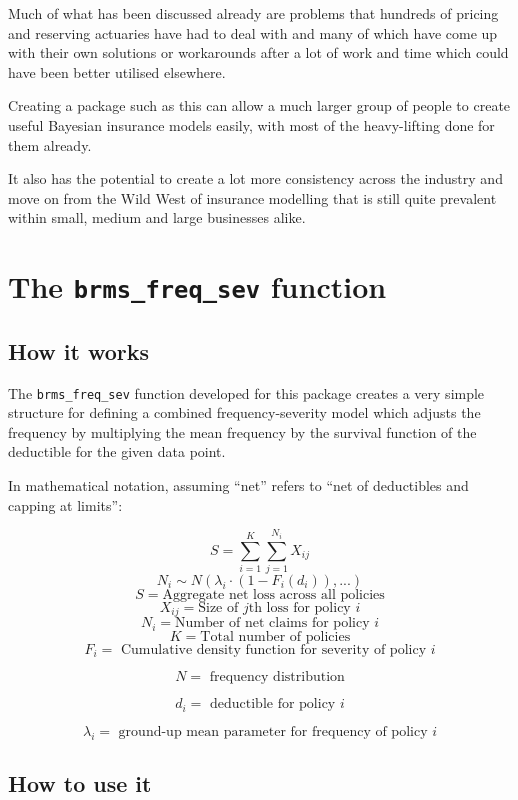 \documentclass[
]{book}
\begin{document}
Much of what has been discussed already are problems that hundreds of pricing and reserving actuaries have had to deal with and many of which have come up with their own solutions or workarounds after a lot of work and time which could have been better utilised elsewhere.

Creating a package such as this can allow a much larger group of people to create useful Bayesian insurance models easily, with most of the heavy-lifting done for them already.

It also has the potential to create a lot more consistency across the industry and move on from the Wild West of insurance modelling that is still quite prevalent within small, medium and large businesses alike.

\hypertarget{the-brms_freq_sev-function}{%
\section{\texorpdfstring{The \texttt{brms\_freq\_sev} function}{The brms\_freq\_sev function}}\label{the-brms_freq_sev-function}}

\hypertarget{how-it-works}{%
\subsection{How it works}\label{how-it-works}}

The \texttt{brms\_freq\_sev} function developed for this package creates a very simple structure for defining a combined frequency-severity model which adjusts the frequency by multiplying the mean frequency by the survival function of the deductible for the given data point.

In mathematical notation, assuming ``net'' refers to ``net of deductibles and capping at limits'':

\[S = \sum_{i=1}^K\sum_{j=1}^{N_i}X_{ij}\]
\[N_i \sim N(\lambda_i \cdot (1-F_i(d_i)), ...)\]
\[S = \mbox{Aggregate net loss across all policies}\]
\[X_{ij} = \mbox{Size of } j \mbox{th loss for policy } i\]
\[N_i = \mbox{Number of net claims for policy } i\]
\[K = \mbox{Total number of policies}\]
\[F_{i} = \mbox{ Cumulative density function for severity of policy } i\]

\[N = \mbox{ frequency distribution}\]

\[d_i = \mbox{ deductible for policy } i\]

\[\lambda_i = \mbox{ ground-up mean parameter for frequency of policy } i\]

\hypertarget{how-to-use-it}{%
\subsection{How to use it}\label{how-to-use-it}}
\end{document}

